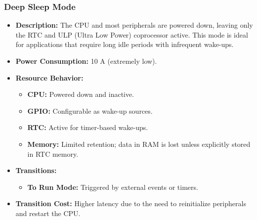 \documentclass[a4paper, 11pt]{article}
\begin{document}
    \subsubsection*{Deep Sleep Mode}
    \begin{itemize}
        \item \textbf{Description:} The CPU and most peripherals are powered down, leaving only the RTC and ULP (Ultra Low Power) coprocessor active. This mode is ideal for applications that require long idle periods with infrequent wake-ups.
        \item \textbf{Power Consumption:} 10 \textmu A (extremely low).
        \item \textbf{Resource Behavior:}
        \begin{itemize}
            \item \textbf{CPU:} Powered down and inactive.
            \item \textbf{GPIO:} Configurable as wake-up sources.
            \item \textbf{RTC:} Active for timer-based wake-ups.
            \item \textbf{Memory:} Limited retention; data in RAM is lost unless explicitly stored in RTC memory.
        \end{itemize}
        \item \textbf{Transitions:}
        \begin{itemize}
            \item \textbf{To Run Mode:} Triggered by external events or timers.
        \end{itemize}
        \item \textbf{Transition Cost:} Higher latency due to the need to reinitialize peripherals and restart the CPU.
    \end{itemize}
    
\end{document}
